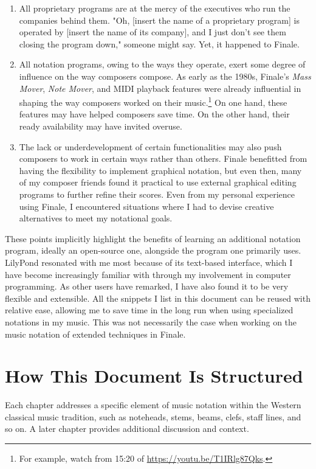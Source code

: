 \begin{enumerate}

\item All proprietary programs are at the mercy of the executives who run the companies behind them. "Oh, [insert the name of a proprietary program] is operated by [insert the name of its company], and I just don't see them closing the program down," someone might say. Yet, it happened to Finale. 

\item All notation programs, owing to the ways they operate, exert some degree of influence on the way composers compose. As early as the 1980s, Finale's \textit{Mass Mover}, \textit{Note Mover}, and MIDI playback features were already influential in shaping the way composers worked on their music.\footnote{For example, watch from 15:20 of \url{https://youtu.be/T1IRlg87Qks}.} On one hand, these features may have helped composers save time. On the other hand, their ready availability may have invited overuse. 

\item The lack or underdevelopment of certain functionalities may also push composers to work in certain ways rather than others. Finale benefitted from having the flexibility to implement graphical notation, but even then, many of my composer friends found it practical to use external graphical editing programs to further refine their scores. Even from my personal experience using Finale, I encountered situations where I had to devise creative alternatives to meet my notational goals. 
\end{enumerate}

These points implicitly highlight the benefits of learning an additional notation program, ideally an open-source one, alongside the program one primarily uses. LilyPond resonated with me most because of its text-based interface, which I have become increasingly familiar with through my involvement in computer programming. As other users have remarked, I have also found it to be very flexible and extensible. All the snippets I list in this document can be reused with relative ease, allowing me to save time in the long run when using specialized notations in my music. This was not necessarily the case when working on the music notation of extended techniques in Finale.


\section{How This Document Is Structured}
Each chapter addresses a specific element of music notation within the Western classical music tradition, such as noteheads, stems, beams, clefs, staff lines, and so on. A later chapter provides additional discussion and context.


